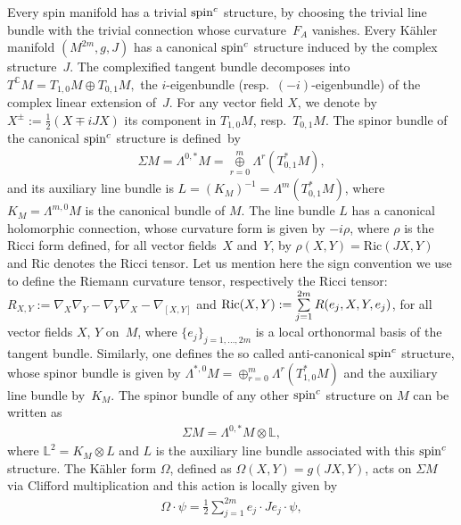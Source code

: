 \documentclass[10pt,a4paper]{amsart}
\numberwithin{equation}{section}
\theoremstyle{definition}
\begin{document}
Every spin manifold has a trivial ${\mathop{\rm spin}^c}$ structure, by
choosing the trivial line bundle with the trivial connection whose curvature~$F_A$
vanishes.  Every K\"ahler manifold $(M^{2m},g,J)$ has a canonical
${\mathop{\rm spin}^c}$ structure induced by the complex structure~$J$.
The complexif\/ied tangent bundle decomposes into
$T^{\mathbb{C}} M = T_{1,0} M\oplus T_{0,1} M,$
 the $i$-eigenbundle (resp.~$(-i)$-eigenbundle) of the complex linear extension of~$J$.
For any vector f\/ield $X$, we denote by $X^{\pm}:=\frac{1}{2}(X\mp iJX)$ its component in $T_{1,0} M$, resp.~$T_{0,1} M$.
The spinor bundle of the canonical ${\mathop{\rm spin}^c}$ structure is def\/ined~by
\begin{gather*}
\Sigma M = \Lambda^{0,*} M =\overset{m}{\underset{r=0}{\oplus}} \Lambda^r (T_{0,1}^* M),
\end{gather*}
and its auxiliary line bundle is  $L = (K_M)^{-1}= \Lambda^m (T_{0,1}^* M)$, where $K_M=\Lambda^{m,0}M$ is the canonical bundle of $M$.
The line bundle $L$ has a canonical holomorphic connection, whose curvature form is given by $- i\rho$,
where $\rho$ is the Ricci form def\/ined, for all vector f\/ields~$X$ and~$Y$, by $\rho(X, Y) = \mathrm{Ric}(JX, Y)$ and $\mathrm{Ric}$ denotes the Ricci tensor. Let us mention here the sign convention we use to def\/ine the Riemann curvature tensor, respectively the Ricci tensor: $R_{X,Y}:=\nabla_{X}\nabla_{Y}
-\nabla_{Y}\nabla_{X}-\nabla_{[X,Y]}$ and ${\mathop{\rm Ric}}(X,Y):=\sum\limits_{j=1}^{2m}R(e_j,X,Y,e_j)$, for all vector f\/ields $X$, $Y$ on~$M$, where $\{e_j\}_{j=1,\dots, 2m}$ is a local orthonormal basis of the tangent bundle.
Similarly, one def\/ines  the so called anti-canonical ${\mathop{\rm spin}^c}$ structure, whose spinor bundle is given by
$\Lambda^{*, 0} M =\oplus_{r=0}^m \Lambda^r (T_{1, 0}^* M)$ and the auxiliary line bundle by~$K_M$. The spinor bundle of any other ${\mathop{\rm spin}^c}$ structure on $M$ can be written as
\begin{gather*}
\Sigma M =  \Lambda^{0, *} M \otimes \mathbb L,
\end{gather*}
where $\mathbb L^2 = K_M\otimes L$ and  $L$ is the auxiliary line bundle associated with this ${\mathop{\rm spin}^c}$ structure.
The K\"ahler form $\Omega$, def\/ined as $\Omega(X,Y)=g(JX,Y)$, acts on $\Sigma M$ via Clif\/ford multiplication
and this action is locally  given by
\begin{gather}\label{defomega}
\Omega\cdot \psi = \frac{1}{2} \sum_{j=1}^{2m} e_j\cdot Je_j\cdot\psi,
\end{gather}
\end{document}
